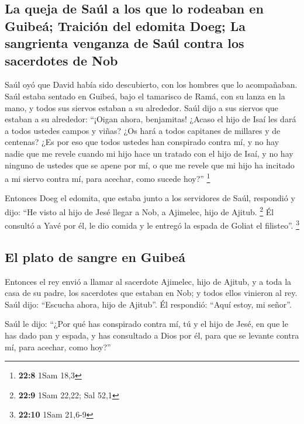 \begin{paracol}{2}
\hypertarget{la-queja-de-sauxfal-a-los-que-lo-rodeaban-en-guibeuxe1-traiciuxf3n-del-edomita-doeg-la-sangrienta-venganza-de-sauxfal-contra-los-sacerdotes-de-nob}{%
\subsection{La queja de Saúl a los que lo rodeaban en Guibeá; Traición
del edomita Doeg; La sangrienta venganza de Saúl contra los sacerdotes
de
Nob}\label{la-queja-de-sauxfal-a-los-que-lo-rodeaban-en-guibeuxe1-traiciuxf3n-del-edomita-doeg-la-sangrienta-venganza-de-sauxfal-contra-los-sacerdotes-de-nob}}

 Saúl oyó que David había sido descubierto, con los
hombres que lo acompañaban. Saúl estaba sentado en Guibeá, bajo el
tamarisco de Ramá, con su lanza en la mano, y todos sus siervos estaban
a su alrededor.  Saúl dijo a sus siervos que estaban a su
alrededor: ``¡Oigan ahora, benjamitas! ¿Acaso el hijo de Isaí les dará a
todos ustedes campos y viñas? ¿Os hará a todos capitanes de millares y
de centenas?  ¿Es por eso que todos ustedes han conspirado
contra mí, y no hay nadie que me revele cuando mi hijo hace un tratado
con el hijo de Isaí, y no hay ninguno de ustedes que se apene por mí, o
que me revele que mi hijo ha incitado a mi siervo contra mí, para
acechar, como sucede hoy?'' \footnote{\textbf{22:8} 1Sam 18,3}

 Entonces Doeg el edomita, que estaba junto a los
servidores de Saúl, respondió y dijo: ``He visto al hijo de Jesé llegar
a Nob, a Ajimelec, hijo de Ajitub. \footnote{\textbf{22:9} 1Sam 22,22;
  Sal 52,1}  Él consultó a Yavé por él, le dio comida y
le entregó la espada de Goliat el filisteo''. \footnote{\textbf{22:10}
  1Sam 21,6-9}

\hypertarget{el-plato-de-sangre-en-guibeuxe1}{%
\subsection{El plato de sangre en
Guibeá}\label{el-plato-de-sangre-en-guibeuxe1}}

 Entonces el rey envió a llamar al sacerdote Ajimelec,
hijo de Ajitub, y a toda la casa de su padre, los sacerdotes que estaban
en Nob; y todos ellos vinieron al rey.  Saúl dijo:
``Escucha ahora, hijo de Ajitub''. Él respondió: ``Aquí estoy, mi
señor''.

 Saúl le dijo: ``¿Por qué has conspirado contra mí, tú y
el hijo de Jesé, en que le has dado pan y espada, y has consultado a
Dios por él, para que se levante contra mí, para acechar, como hoy?''


\end{paracol}

